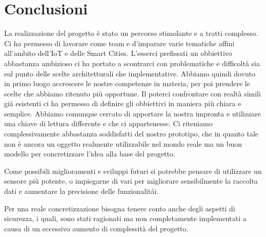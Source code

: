 \section{Conclusioni}

La realizzazione del progetto è stato un percorso stimolante e a tratti complesso. Ci ha permesso di lavorare come team e d’imparare varie tematiche affini all’ambito dell’IoT e delle Smart Cities.
L’esserci prefissati un obbiettivo abbastanza ambizioso ci ha portato a scontrarci con problematiche e difficoltà sia sul punto delle scelte architetturali che implementative. Abbiamo quindi dovuto in primo luogo accrescere le nostre competenze in materia, per poi prendere le scelte che abbiamo ritenuto più opportune.
Il poterci confrontare con realtà simili già esistenti ci ha permesso di definire gli obbiettivi in maniera più chiara e semplice.
Abbiamo comunque cercato di apportare la nostra impronta e utilizzare una chiave di lettura differente e che ci appartenesse. Ci riteniamo complessivamente abbastanza soddisfatti del nostro prototipo, che in quanto tale non è ancora un oggetto realmente utilizzabile nel mondo reale ma un buon modello per concretizzare l'idea alla base del progetto.

Come possibili miglioramenti e sviluppi futuri si potrebbe pensare di utilizzare un sensore più potente, o impiegarne di vari per migliorare sensibilmente la raccolta dati e aumentare la precisione delle funzionalitài.

Per una reale concretizzazione bisogna tenere conto anche degli aspetti di sicurezza, i quali, sono stati ragionati ma non completamente implementati a causa di un eccessivo aumento di complessità del progetto.
